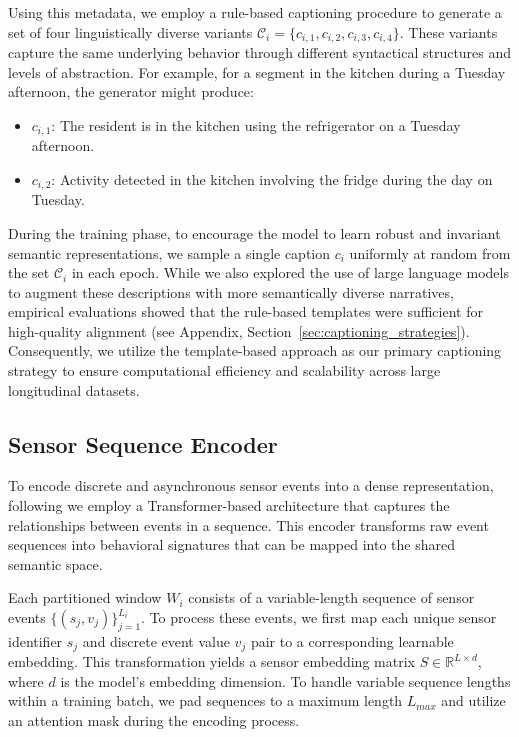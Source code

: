 Using this metadata, we employ a rule-based captioning procedure to generate a set of four linguistically diverse variants $\mathcal{C}_i = \{c_{i,1}, c_{i,2}, c_{i,3}, c_{i,4}\}$. These variants capture the same underlying behavior through different syntactical structures and levels of abstraction. For example, for a segment in the kitchen during a Tuesday afternoon, the generator might produce:

\begin{itemize}
    \item $c_{i,1}$: The resident is in the kitchen using the refrigerator on a Tuesday afternoon.
    \item $c_{i,2}$: Activity detected in the kitchen involving the fridge during the day on Tuesday.
\end{itemize}

During the training phase, to encourage the model to learn robust and invariant semantic representations, we sample a single caption $c_i$ uniformly at random from the set $\mathcal{C}_i$ in each epoch. While we also explored the use of large language models to augment these descriptions with more semantically diverse narratives, empirical evaluations showed that the rule-based templates were sufficient for high-quality alignment (see Appendix, Section~\ref{sec:captioning_strategies}). Consequently, we utilize the template-based approach as our primary captioning strategy to ensure computational efficiency and scalability across large longitudinal datasets.


\subsection{Sensor Sequence Encoder}
\label{sec:sensor_encoder}

To encode discrete and asynchronous sensor events into a dense representation, following \cite{karpekov2025discover, transformers_for_smarthome2025, hiremath2022bootstrapping} we employ a Transformer-based architecture that captures the relationships between events in a sequence. This encoder transforms raw event sequences into behavioral signatures that can be mapped into the shared semantic space.

Each partitioned window $W_i$ consists of a variable-length sequence of sensor events $\{(s_j, v_j)\}_{j=1}^{L_i}$. To process these events, we first map each unique sensor identifier $s_j$ and discrete event value $v_j$ pair to a corresponding learnable embedding. This transformation yields a sensor embedding matrix $S \in \mathbb{R}^{L \times d}$, where $d$ is the model's embedding dimension. To handle variable sequence lengths within a training batch, we pad sequences to a maximum length $L_{max}$ and utilize an attention mask during the encoding process.

